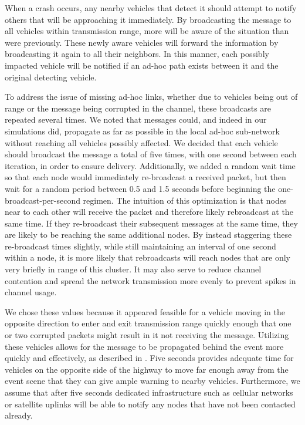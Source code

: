 \documentclass{IEEEtran}
\begin{document}
When a crash occurs, any nearby vehicles that detect it should attempt to notify others that will be approaching it immediately.
By broadcasting the message to all vehicles within transmission range, more will be aware of the situation than were previously.
These newly aware vehicles will forward the information by broadcasting it again to all their neighbors.
In this manner, each possibly impacted vehicle will be notified if an ad-hoc path exists between it and the original detecting vehicle.

To address the issue of missing ad-hoc links, whether due to vehicles being out of range or the message being corrupted in the channel, these broadcasts are repeated several times.
We noted that messages could, and indeed in our simulations did, propagate as far as possible in the local ad-hoc sub-network without reaching all vehicles possibly affected.
We decided that each vehicle should broadcast the message a total of five times, with one second between each iteration, in order to ensure delivery.
Additionally, we added a random wait time so that each node would immediately re-broadcast a received packet, but then wait for a random period between 0.5 and 1.5 seconds before beginning the one-broadcast-per-second regimen.
The intuition of this optimization is that nodes near to each other will receive the packet and therefore likely rebroadcast at the same time.
If they re-broadcast their subsequent messages at the same time, they are likely to be reaching the same additional nodes.
By instead staggering these re-broadcast times slightly, while still maintaining an interval of one second within a node, it is more likely that rebroadcasts will reach nodes that are only very briefly in range of this cluster.
It may also serve to reduce channel contention and spread the network transmission more evenly to prevent spikes in channel usage.

We chose these values because it appeared feasible for a vehicle moving in the opposite direction to enter and exit transmission range quickly enough that one or two corrupted packets might result in it not receiving the message.
Utilizing these vehicles allows for the message to be propagated behind the event more quickly and effectively, as described in \cite{vanet_dissem}.
Five seconds provides adequate time for vehicles on the opposite side of the highway to move far enough away from the event scene that they can give ample warning to nearby vehicles.
Furthermore, we assume that after five seconds dedicated infrastructure such as cellular networks or satellite uplinks will be able to notify any nodes that have not been contacted already.
\end{document}
